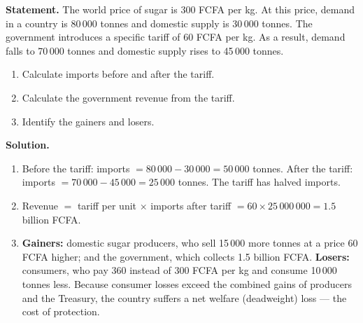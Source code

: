 \documentclass[11pt]{article}
\begin{document}
\begin{exoresolu}
\textbf{Statement.} The world price of sugar is 300 FCFA per kg. At this price, demand in a country is 80\,000 tonnes and domestic supply is 30\,000 tonnes. The government introduces a specific tariff of 60 FCFA per kg. As a result, demand falls to 70\,000 tonnes and domestic supply rises to 45\,000 tonnes.
\begin{enumerate}
\item Calculate imports before and after the tariff.
\item Calculate the government revenue from the tariff.
\item Identify the gainers and losers.
\end{enumerate}
\tcblower
\textbf{Solution.}
\begin{enumerate}
\item Before the tariff: imports $= 80\,000 - 30\,000 = 50\,000$ tonnes. After the tariff: imports $= 70\,000 - 45\,000 = 25\,000$ tonnes. The tariff has halved imports.
\item Revenue $=$ tariff per unit $\times$ imports after tariff $= 60 \times 25\,000\,000 = 1.5$ billion FCFA.
\item \textbf{Gainers:} domestic sugar producers, who sell 15\,000 more tonnes at a price 60 FCFA higher; and the government, which collects 1.5 billion FCFA. \textbf{Losers:} consumers, who pay 360 instead of 300 FCFA per kg and consume 10\,000 tonnes less. Because consumer losses exceed the combined gains of producers and the Treasury, the country suffers a net welfare (deadweight) loss --- the cost of protection.
\end{enumerate}
\end{exoresolu}
\end{document}
